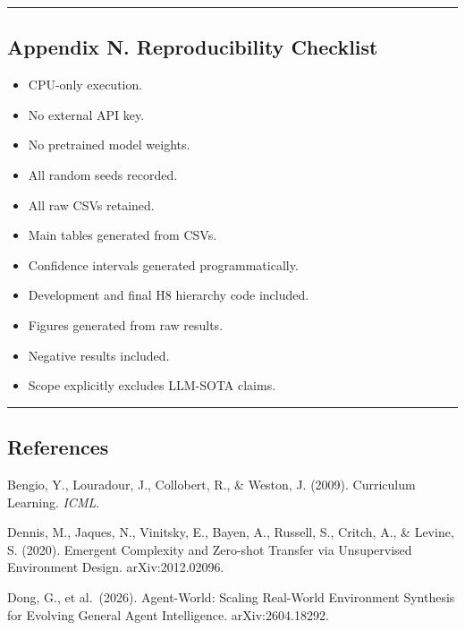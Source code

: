 \documentclass[
]{article}
\providecommand{\tightlist}{%
  \setlength{\itemsep}{0pt}\setlength{\parskip}{0pt}}
\begin{document}
\begin{center}\rule{0.5\linewidth}{0.5pt}\end{center}

\subsection{Appendix N. Reproducibility
Checklist}\label{appendix-n.-reproducibility-checklist}

\begin{itemize}
\tightlist
\item[$\boxtimes$]
  CPU-only execution.
\item[$\boxtimes$]
  No external API key.
\item[$\boxtimes$]
  No pretrained model weights.
\item[$\boxtimes$]
  All random seeds recorded.
\item[$\boxtimes$]
  All raw CSVs retained.
\item[$\boxtimes$]
  Main tables generated from CSVs.
\item[$\boxtimes$]
  Confidence intervals generated programmatically.
\item[$\boxtimes$]
  Development and final H8 hierarchy code included.
\item[$\boxtimes$]
  Figures generated from raw results.
\item[$\boxtimes$]
  Negative results included.
\item[$\boxtimes$]
  Scope explicitly excludes LLM-SOTA claims.
\end{itemize}

\begin{center}\rule{0.5\linewidth}{0.5pt}\end{center}

\subsection{References}\label{references}

Bengio, Y., Louradour, J., Collobert, R., \& Weston, J. (2009).
Curriculum Learning. \emph{ICML}.

Dennis, M., Jaques, N., Vinitsky, E., Bayen, A., Russell, S., Critch,
A., \& Levine, S. (2020). Emergent Complexity and Zero-shot Transfer via
Unsupervised Environment Design. arXiv:2012.02096.

Dong, G., et al.~(2026). Agent-World: Scaling Real-World Environment
Synthesis for Evolving General Agent Intelligence. arXiv:2604.18292.
\end{document}
